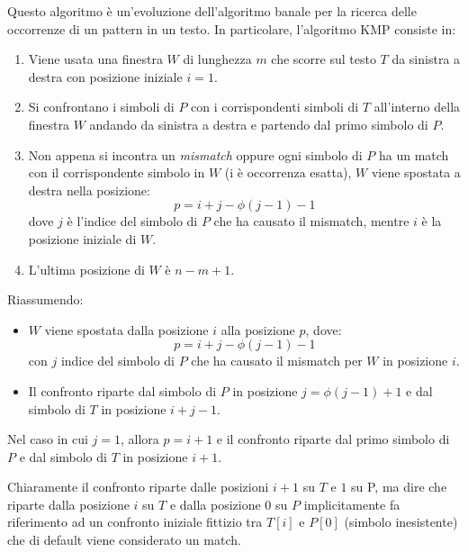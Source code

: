 Questo algoritmo è un'evoluzione dell'algoritmo banale per la ricerca delle
occorrenze di un pattern in un testo. In particolare, l'algoritmo KMP consiste in:
\begin{enumerate}
    \item Viene usata una finestra $W$ di lunghezza $m$ che scorre sul testo $T$
          da sinistra a destra con posizione iniziale $i = 1$.
    \item Si confrontano i simboli di $P$ con i corrispondenti simboli di $T$
          all'interno della finestra $W$ andando da sinistra a destra e partendo
          dal primo simbolo di $P$.
    \item Non appena si incontra un \textit{mismatch} oppure ogni simbolo di $P$
          ha un match con il corrispondente simbolo in $W$ (i è occorrenza esatta),
          $W$ viene spostata a destra nella posizione:
          \begin{equation}
              p = i + j - \phi(j - 1) - 1
          \end{equation}
          dove $j$ è l'indice del simbolo di $P$ che ha causato il mismatch,
          mentre $i$ è la posizione iniziale di $W$.
    \item L'ultima posizione di $W$ è $n - m + 1$.
\end{enumerate}
Riassumendo:
\begin{itemize}
    \item $W$ viene spostata dalla posizione $i$ alla posizione $p$, dove:
          \begin{equation}
              p = i + j - \phi(j - 1) - 1
          \end{equation}
          con $j$ indice del simbolo di $P$ che ha causato il mismatch per $W$
          in posizione $i$.
    \item Il confronto riparte dal simbolo di $P$ in posizione $j = \phi(j - 1)
              + 1$ e dal simbolo di $T$ in posizione $i + j - 1$.
\end{itemize}
Nel caso in cui $j = 1$, allora $p = i + 1$ e il confronto riparte dal primo
simbolo di $P$ e dal simbolo di $T$ in posizione $i + 1$.
\begin{nota}
    Chiaramente il confronto riparte dalle posizioni $i + 1$ su $T$ e $1$ su P,
    ma dire che riparte dalla posizione $i$ su $T$ e dalla posizione $0$ su $P$
    implicitamente fa riferimento ad un confronto iniziale fittizio tra $T[i]$ e
    $P[0]$ (simbolo inesistente) che di default viene considerato un match.
\end{nota}
